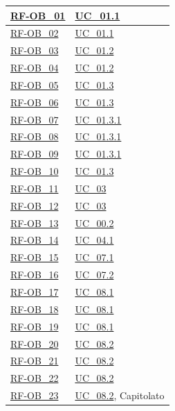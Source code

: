 \begin{longtable}{|>{\raggedright}p{}|>{\raggedright\arraybackslash}p{}|}
    \hline
    \hyperlink{rf-ob_1}{RF-OB\_01} & \hyperref[uc_01.1]{UC\_01.1} \\ \hline
    \hyperlink{rf-ob_2}{RF-OB\_02} & \hyperref[uc_01.1]{UC\_01.1} \\ \hline
    \hyperlink{rf-ob_3}{RF-OB\_03} & \hyperref[uc_01.2]{UC\_01.2} \\ \hline
    \hyperlink{rf-ob_4}{RF-OB\_04} & \hyperref[uc_01.2]{UC\_01.2} \\ \hline
    \hyperlink{rf-ob_5}{RF-OB\_05} & \hyperref[uc_01.3]{UC\_01.3} \\ \hline
    \hyperlink{rf-ob_6}{RF-OB\_06} & \hyperref[uc_01.3]{UC\_01.3} \\ \hline
    \hyperlink{rf-ob_7}{RF-OB\_07} & \hyperref[uc_01.3.1]{UC\_01.3.1} \\ \hline
    \hyperlink{rf-ob_8}{RF-OB\_08} & \hyperref[uc_01.3.1]{UC\_01.3.1} \\ \hline
    \hyperlink{rf-ob_9}{RF-OB\_09} & \hyperref[uc_01.3.1]{UC\_01.3.1} \\ \hline
    \hyperlink{rf-ob_10}{RF-OB\_10} & \hyperref[uc_01.3]{UC\_01.3} \\ \hline
    \hyperlink{rf-ob_11}{RF-OB\_11} & \hyperref[uc_03]{UC\_03} \\ \hline
    \hyperlink{rf-ob_12}{RF-OB\_12} & \hyperref[uc_03]{UC\_03} \\ \hline
    \hyperlink{rf-ob_13}{RF-OB\_13} & \hyperref[uc_00.2]{UC\_00.2} \\ \hline
    \hyperlink{rf-ob_14}{RF-OB\_14} & \hyperref[uc_04.1]{UC\_04.1} \\ \hline
    \hyperlink{rf-ob_15}{RF-OB\_15} & \hyperref[uc_07.1]{UC\_07.1} \\ \hline
    \hyperlink{rf-ob_16}{RF-OB\_16} & \hyperref[uc_07.2]{UC\_07.2} \\ \hline
    \hyperlink{rf-ob_17}{RF-OB\_17} & \hyperref[uc_08.1]{UC\_08.1} \\ \hline
    \hyperlink{rf-ob_18}{RF-OB\_18} & \hyperref[uc_08.1]{UC\_08.1} \\ \hline
    \hyperlink{rf-ob_19}{RF-OB\_19} & \hyperref[uc_08.1]{UC\_08.1} \\ \hline
    \hyperlink{rf-ob_20}{RF-OB\_20} & \hyperref[uc_08.2]{UC\_08.2} \\ \hline
    \hyperlink{rf-ob_21}{RF-OB\_21} & \hyperref[uc_08.2]{UC\_08.2} \\ \hline
    \hyperlink{rf-ob_22}{RF-OB\_22} & \hyperref[uc_08.2]{UC\_08.2} \\ \hline
    \hyperlink{rf-ob_23}{RF-OB\_23} & \hyperref[uc_08.2]{UC\_08.2}, Capitolato \\ \hline

\end{longtable}
